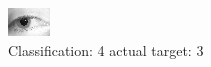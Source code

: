 \begin{figure}[h!]
\begin{center}
\includegraphics[width=0.60\columnwidth]{figures/ID1315_class_4_target_3.png}
\end{center}
\caption{ Classification: 4 actual target: 3}
\label{fig:ID1315_class_4_target_3}
\end{figure}
